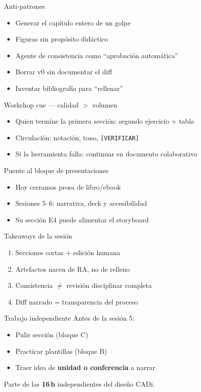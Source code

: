 \documentclass[aspectratio=169,11pt]{beamer}
\begin{document}
\begin{frame}{Anti-patrones}
\begin{itemize}
\item Generar el capítulo entero de un golpe
\item Figuras sin propósito didáctico
\item Agente de consistencia como ``aprobación automática''
\item Borrar v0 sin documentar el diff
\item Inventar bibliografía para ``rellenar''
\end{itemize}
\end{frame}


\begin{frame}{Workshop cue --- calidad $>$ volumen}
\begin{itemize}
\item Quien termine la primera sección: segundo ejercicio + tabla
\item Circulación: notación, tono, \texttt{[VERIFICAR]}
\item Si la herramienta falla: continuar en documento colaborativo
\end{itemize}
\end{frame}

\begin{frame}{Puente al bloque de presentaciones}
\begin{itemize}
\item Hoy cerramos prosa de libro/ebook
\item Sesiones 5--6: narrativa, deck y accesibilidad
\item Su sección E4 puede alimentar el storyboard
\end{itemize}
\end{frame}

\begin{frame}{Takeaways de la sesión}
\begin{enumerate}
\item Secciones cortas + edición humana
\item Artefactos nacen de RA, no de relleno
\item Consistencia $\neq$ revisión disciplinar completa
\item Diff narrado = transparencia del proceso
\end{enumerate}
\end{frame}

\begin{frame}{Trabajo independiente}
Antes de la sesión 5:
\begin{itemize}
\item Pulir sección (bloque C)
\item Practicar plantillas (bloque B)
\item Traer idea de \textbf{unidad o conferencia} a narrar
\end{itemize}
Parte de las \textbf{16\,h} independientes del diseño CADi.
\end{frame}
\end{document}
